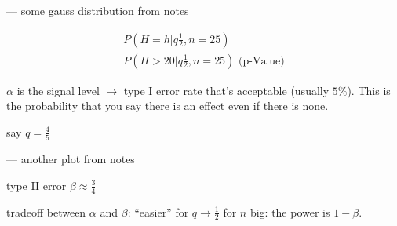 --- some gauss distribution from notes

\begin{align*}
P\left(H=h|q\frac{1}{2},n=25\right) \\
P\left(H>20|q\frac{1}{2},n=25\right) \mbox{ (p-Value)}
\end{align*}

$\alpha$ is the signal level $\rightarrow$ type I error rate that's acceptable (usually $5\%$). This is the probability that you say there is an effect even if there is none.

say $q = \frac{4}{5}$

--- another plot from notes

type II error $\beta \approx \frac{3}{4}$

tradeoff between $\alpha$ and $\beta$: ``easier'' for $q \rightarrow \frac{1}{2}$ for $n$ big: the power is $1-\beta$.